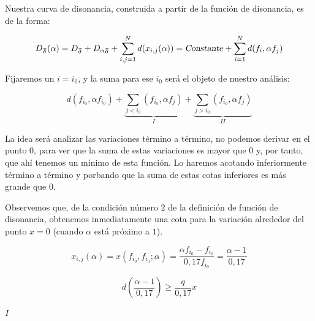 \documentclass[11pt,a4paper]{article}
\begin{document}
	Nuestra curva de disonancia, construida a partir de la función de disonancia, es de la forma:
	

	\begin{equation}
	     D_{\mathfrak{F}} (\alpha) = D_{\mathfrak{F}} + D_{\mathfrak{\alpha F}} + \sum_{i,j=1}^{N} d(x_{i,j} (\alpha))      
	    = \textnormal{\textsl{Constante}} + \sum_{i=1}^{N} d(f_i, \alpha f_j)
	\end{equation}
       
  
	
	Fijaremos un $ i = i_0 $, y la suma para ese $i_0$ será el objeto de nuestro análisis:
	
	\begin{equation}
	   d(f_{i_0}, \alpha f_{i_0})  + \underbrace{ \sum_{j < i_0} (f_{i_0}, \alpha f_j) }_{\boxed{I}} + \underbrace{ \sum_{j > i_0} (f_{i_0}, \alpha f_j) }_{\boxed{II}}
	\end{equation}
	
	
	La idea será analizar las variaciones término a término, no podemos derivar en el punto $0$, para ver que la suma de estas variaciones es mayor que $0$ y, por tanto, que ahí tenemos un mínimo de esta función. Lo haremos acotando inferiormente término a término y porbando que la suma de estas cotas inferiores es más grande que 0.
	
	Observemos que, de la condición número $2$ de la definición de función de disonancia, obtenemos inmediatamente una cota para la variación alrededor del punto $x = 0$ (cuando $\alpha$ está próximo a $1$).
	
	\begin{equation*}
	   x_{i,j} (\alpha) = x(f_{i_0}, f_{i_0}; \alpha) = \frac{\alpha f_{i_0} - f_{i_0}}{0,17 f_{i_0}} = \frac{\alpha -1}{0,17}
	\end{equation*}
	
	\begin{equation}
	    d(\frac{\alpha -1}{0,17}) \geq \frac{q}{0,17} x
	\end{equation}
	
	$ \boxed{I} $
	
\end{document}
